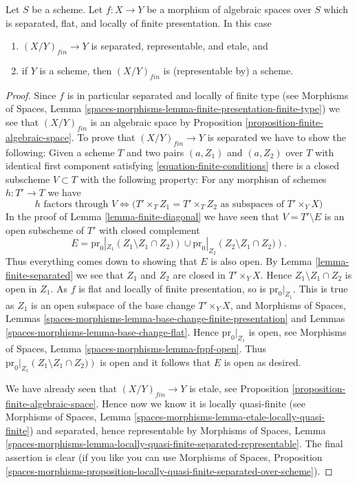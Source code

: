 \begin{lemma}
\label{lemma-finite-separated-flat-locally-finite-presentation}
Let $S$ be a scheme.
Let $f : X \to Y$ be a morphism of algebraic spaces over $S$ which
is separated, flat, and locally of finite presentation.
In this case
\begin{enumerate}
\item $(X/Y)_{fin} \to Y$ is separated, representable, and etale, and
\item if $Y$ is a scheme, then $(X/Y)_{fin}$ is (representable by) a scheme.
\end{enumerate}
\end{lemma}

\begin{proof}
Since $f$ is in particular separated and locally of finite type (see
Morphisms of Spaces,
Lemma \ref{spaces-morphisms-lemma-finite-presentation-finite-type})
we see that $(X/Y)_{fin}$ is an algebraic space by
Proposition \ref{proposition-finite-algebraic-space}.
To prove that $(X/Y)_{fin} \to Y$ is separated we have to show
the following: Given a scheme $T$ and two pairs $(a, Z_1)$ and $(a, Z_2)$
over $T$
with identical first component satisfying \ref{equation-finite-conditions}
there is a closed subscheme $V \subset T$ with the following
property: For any morphism of schemes $h : T' \to T$ we have
$$
h \text{ factors through } V \Leftrightarrow
\Big(T' \times_T Z_1 = T' \times_T Z_2
\text{ as subspaces of }T' \times_Y X\Big)
$$
In the proof of
Lemma \ref{lemma-finite-diagonal}
we have seen that $V = T' \setminus E$ is an open subscheme of $T'$
with closed complement
$$
E =
\text{pr}_0|_{Z_1}\left(Z_1 \setminus Z_1 \cap Z_2)\right)
\cup
\text{pr}_0|_{Z_2}\left(Z_2 \setminus Z_1 \cap Z_2)\right).
$$
Thus everything comes down to showing that $E$ is also open. By
Lemma \ref{lemma-finite-separated}
we see that $Z_1$ and $Z_2$ are closed in $T' \times_Y X$. Hence
$Z_1 \setminus Z_1 \cap Z_2$ is open in $Z_1$. As $f$ is flat and
locally of finite presentation, so is $\text{pr}_0|_{Z_1}$.
This is true as $Z_1$ is an open subspace of the base change
$T' \times_Y X$, and
Morphisms of Spaces,
Lemmas \ref{spaces-morphisms-lemma-base-change-finite-presentation} and
Lemmas \ref{spaces-morphisms-lemma-base-change-flat}.
Hence $\text{pr}_0|_{Z_1}$ is open, see
Morphisms of Spaces, Lemma \ref{spaces-morphisms-lemma-fppf-open}.
Thus $\text{pr}_0|_{Z_1}\left(Z_1 \setminus Z_1 \cap Z_2)\right)$ is
open and it follows that $E$ is open as desired.

\medskip\noindent
We have already seen that $(X/Y)_{fin} \to Y$ is etale, see
Proposition \ref{proposition-finite-algebraic-space}.
Hence now we know it is locally quasi-finite (see
Morphisms of Spaces,
Lemma \ref{spaces-morphisms-lemma-etale-locally-quasi-finite})
and separated, hence representable by
Morphisms of Spaces, Lemma
\ref{spaces-morphisms-lemma-locally-quasi-finite-separated-representable}.
The final assertion is clear (if you like you can use
Morphisms of Spaces, Proposition
\ref{spaces-morphisms-proposition-locally-quasi-finite-separated-over-scheme}).
\end{proof}

